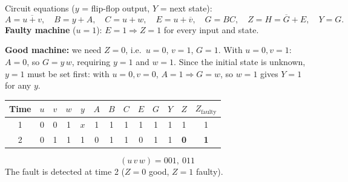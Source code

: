 \documentclass[a4paper, 10pt]{article}
\begin{document}
\begin{solution}
	\noindent Circuit equations (\(y\) = flip-flop output, \(Y\) = next state):
	\[
		A = \overline{u+v},\quad B = y + A,\quad C = u + w,\quad E = u + \overline{v},\quad
		G = BC,\quad Z = H = \overline{G} + E,\quad Y = G.
	\]
	\noindent\textbf{Faulty machine} (\(u = 1\)): \(E = 1 \Rightarrow Z = 1\) for every input and state.

	\myspace
	
	\noindent\textbf{Good machine:} we need \(Z = 0\), i.e.\ \(u = 0\), \(v = 1\), \(G = 1\).
	With \(u = 0, v = 1\): \(A = 0\), so \(G = y\,w\), requiring \(y = 1\) and \(w = 1\).
	Since the initial state is unknown, \(y = 1\) must be set first:
	with \(u = 0, v = 0\), \(A = 1 \Rightarrow G = w\), so \(w = 1\) gives \(Y = 1\) for any \(y\).
	\begin{center}
		\begin{tabular}{c|ccc|c|cccccc|c|c}
			\toprule
			Time & \(u\) & \(v\) & \(w\) & \(y\) & \(A\) & \(B\) & \(C\) & \(E\) & \(G\) & \(Y\) & \(Z\) & \(Z_{\text{faulty}}\) \\
			\midrule
			1 & 0 & 0 & 1 & \(x\) & 1 & 1 & 1 & 1 & 1 & 1 & 1 & 1 \\
			2 & 0 & 1 & 1 & 1     & 0 & 1 & 1 & 0 & 1 & 1 & \textbf{0} & \textbf{1} \\
			\bottomrule
		\end{tabular}
	\end{center}
	\[ \boxed{(u\,v\,w) = 001,\ 011} \]
	The fault is detected at time 2 (\(Z = 0\) good, \(Z = 1\) faulty).
\end{solution}
\end{document}
